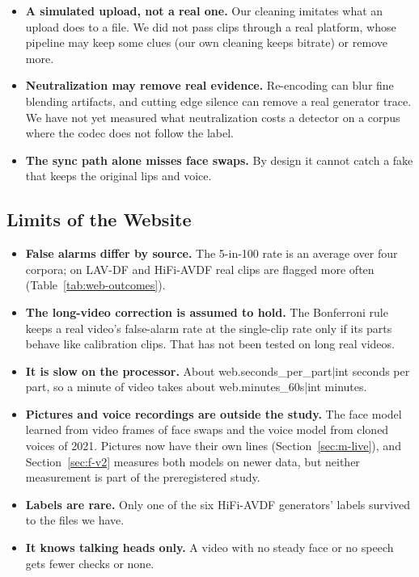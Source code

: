 \begin{itemize}
    \item \textbf{A simulated upload, not a real one.} Our cleaning imitates
    what an upload does to a file. We did not pass clips through a real
    platform, whose pipeline may keep some clues (our own cleaning keeps
    bitrate) or remove more.
    \item \textbf{Neutralization may remove real evidence.} Re-encoding can
    blur fine blending artifacts, and cutting edge silence can remove a real
    generator trace. We have not yet measured what neutralization costs a
    detector on a corpus where the codec does not follow the label.
    \item \textbf{The sync path alone misses face swaps.} By design it cannot
    catch a fake that keeps the original lips and voice.
\end{itemize}

\subsection{Limits of the Website}

\begin{itemize}
    \item \textbf{False alarms differ by source.} The 5-in-100 rate is an
    average over four corpora; on LAV-DF and HiFi-AVDF real clips are flagged
    more often (Table~\ref{tab:web-outcomes}).
    \item \textbf{The long-video correction is assumed to hold.} The
    Bonferroni rule keeps a real video's false-alarm rate at the single-clip
    rate only if its parts behave like calibration clips. That has not been
    tested on long real videos.
    \item \textbf{It is slow on the processor.} About
    {{web.seconds_per_part|int}} seconds per part, so a minute of video takes
    about {{web.minutes_60s|int}} minutes.
    \item \textbf{Pictures and voice recordings are outside the study.} The
    face model learned from video frames of face swaps and the voice model
    from cloned voices of 2021. Pictures now have their own lines
    (Section~\ref{sec:m-live}), and Section~\ref{sec:f-v2} measures both
    models on newer data, but neither measurement is part of the
    preregistered study.
    \item \textbf{Labels are rare.} Only one of the six HiFi-AVDF generators'
    labels survived to the files we have.
    \item \textbf{It knows talking heads only.} A video with no steady face or
    no speech gets fewer checks or none.
\end{itemize}

